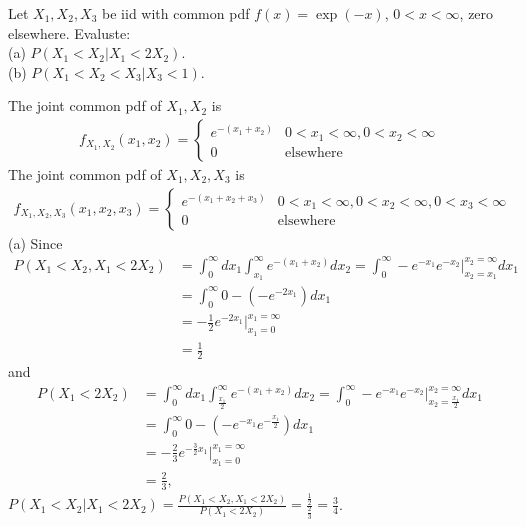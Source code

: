 \begin{exercise}{}{}
    Let $X_1,X_2,X_3$ be iid with common pdf $f(x)=\exp(-x)$, $0<x<\infty$,
    zero elsewhere. Evaluste:\\
    (a) $P(X_1<X_2|X_1<2X_2)$.\\
    (b) $P(X_1<X_2<X_3|X_3<1)$.
\end{exercise}
\begin{solve}
    The joint common pdf of $X_1,X_2$ is
    \begin{align*}
        f_{X_1,X_2}(x_1,x_2)= \left\{\begin{matrix}
            e^{-(x_1+x_2)} & 0<x_1<\infty,0<x_2<\infty\\
            0 & \text{elsewhere}
            \end{matrix}\right.
    \end{align*}
    The joint common pdf of $X_1,X_2,X_3$ is 
    \begin{align*}
        f_{X_1,X_2,X_3}(x_1,x_2,x_3)= \left\{\begin{matrix}
            e^{-(x_1+x_2+x_3)} & 0<x_1<\infty,0<x_2<\infty,0<x_3<\infty \\
            0 & \text{elsewhere}
            \end{matrix}\right.
    \end{align*}
    (a) Since
    \begin{align*}
        P(X_1<X_2,X_1<2X_2)&=\int_{0}^{\infty}dx_1\int_{x_1}^{\infty}e^{-(x_1+x_2)} dx_2 = \int_{0}^{\infty}-e^{-x_1}e^{-x_2}|_{x_2=x_1}^{x_2=\infty}dx_1\\
                           &= \int_{0}^{\infty}0-(-e^{-2x_1})dx_1\\
                           &= -\frac{1}{2}e^{-2x_1}|_{x_1=0}^{x_1=\infty}\\
                           &= \frac{1}{2}
    \end{align*}
    and 
    \begin{align*}
        P(X_1<2X_2)&=\int_{0}^{\infty}dx_1\int_{\frac{x_1}{2}}^{\infty}e^{-(x_1+x_2)} dx_2 = \int_{0}^{\infty}-e^{-x_1}e^{-x_2}|_{x_2=\frac{x_1}{2}}^{x_2=\infty}dx_1\\
                           &= \int_{0}^{\infty}0-(-e^{-x_1}e^{-\frac{x_1}{2}})dx_1\\
                           &= -\frac{2}{3}e^{-\frac{3}{2}x_1}|_{x_1=0}^{x_1=\infty}\\
                           &= \frac{2}{3},
    \end{align*}
    $P(X_1<X_2|X_1<2X_2)=\frac{P(X_1<X_2,X_1<2X_2)}{P(X_1<2X_2)}=\frac{\frac{1}{2}}{\frac{2}{3}}=\frac{3}{4}$.

\end{solve}
